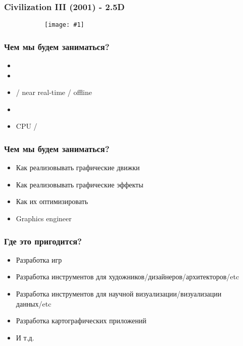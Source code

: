 \documentclass{beamer}
\newcommand{\slideimage}[1]{
  \begin{figure}
    \begin{adjustbox}{width=\textwidth, totalheight=\textheight-2\baselineskip-2\baselineskip,keepaspectratio}
      \texttt{[image: \#1]}
    \end{adjustbox}
  \end{figure}
}
\begin{document}

\begin{frame}
\frametitle{Civilization III (2001) - 2.5D}
\begin{figure}
\slideimage{civ3.png}
\end{figure}
\end{frame}


\begin{frame}
\frametitle{Чем мы будем заниматься?}
\begin{itemize}
\item {}
\item {}
\item {} / near real-time / offline
\item {}
\item CPU / 
\end{itemize}
\end{frame}

\begin{frame}
\frametitle{Чем мы будем заниматься?}
\begin{itemize}
\pause
\item Как реализовывать графические движки
\pause
\item Как реализовывать графические эффекты
\pause
\item Как их оптимизировать
\pause
\item Graphics engineer
\end{itemize}
\end{frame}

\begin{frame}
\frametitle{Где это пригодится?}
\begin{itemize}
\pause
\item Разработка игр
\pause
\item Разработка инструментов для художников/дизайнеров/архитекторов/etc
\pause
\item Разработка инструментов для научной визуализации/визуализации данных/etc
\pause
\item Разработка картографических приложений
\pause
\item И т.д.
\end{itemize}
\end{frame}
\end{document}
